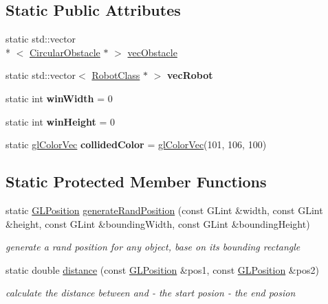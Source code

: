 \subsection*{Static Public Attributes}
\begin{DoxyCompactItemize}
\item 
static std\-::vector\\*
$<$ \hyperlink{classCircularObstacle}{Circular\-Obstacle} $\ast$ $>$ \hyperlink{classEnvironmentClass_a738593c1c3ed257bea8f99f663f59d85}{vec\-Obstacle}
\item 
\hypertarget{classEnvironmentClass_aad109138f5c22257a6d2827ac4c5f70c}{static std\-::vector$<$ \hyperlink{classRobotClass}{Robot\-Class} $\ast$ $>$ {\bfseries vec\-Robot}}\label{classEnvironmentClass_aad109138f5c22257a6d2827ac4c5f70c}

\item 
\hypertarget{classEnvironmentClass_af1e7176105de214ec957d3f7452992a4}{static int {\bfseries win\-Width} = 0}\label{classEnvironmentClass_af1e7176105de214ec957d3f7452992a4}

\item 
\hypertarget{classEnvironmentClass_a59a6025ef7ffc092995111b53a316767}{static int {\bfseries win\-Height} = 0}\label{classEnvironmentClass_a59a6025ef7ffc092995111b53a316767}

\item 
\hypertarget{classEnvironmentClass_ad5de7d6824468cb6ea5ba09b9f10c114}{static \hyperlink{Common_8h_a5113b6588451c418d38d8b3681eb6040}{gl\-Color\-Vec} {\bfseries collided\-Color} = \hyperlink{Common_8h_a5113b6588451c418d38d8b3681eb6040}{gl\-Color\-Vec}(101, 106, 100)}\label{classEnvironmentClass_ad5de7d6824468cb6ea5ba09b9f10c114}

\end{DoxyCompactItemize}
\subsection*{Static Protected Member Functions}
\begin{DoxyCompactItemize}
\item 
static \hyperlink{structGLPosition}{G\-L\-Position} \hyperlink{classEnvironmentClass_a330bbca10dbd5743714d7e722748ae47}{generate\-Rand\-Position} (const G\-Lint \&width, const G\-Lint \&height, const G\-Lint \&bounding\-Width, const G\-Lint \&bounding\-Height)
\begin{DoxyCompactList}\small\item\em generate a rand position for any object, base on its bounding rectangle \end{DoxyCompactList}\item 
static double \hyperlink{classEnvironmentClass_a3fa1b87f8ae74bf1cefda9862e1bdfca}{distance} (const \hyperlink{structGLPosition}{G\-L\-Position} \&pos1, const \hyperlink{structGLPosition}{G\-L\-Position} \&pos2)
\begin{DoxyCompactList}\small\item\em calculate the distance between  and   -\/ the start posion  -\/ the end posion \end{DoxyCompactList}\end{DoxyCompactItemize}
